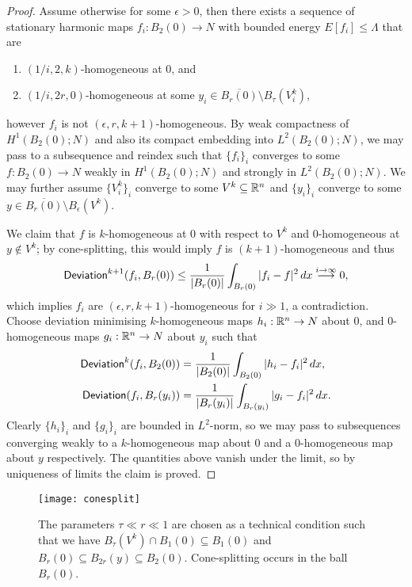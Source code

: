 \begin{proof}
	Assume otherwise for some $\epsilon > 0$, then there exists a sequence of stationary harmonic maps $f_i : B_2 (0) \to N$ with bounded energy $E[f_i] \leq \Lambda$ that are
	\begin{enumerate}
		\item $(1/i, 2, k)$-homogeneous at $0$, and
		\item $(1/i, 2r, 0)$-homogeneous at some $y_i \in \overline{B_r (0)} \setminus B_\tau (V^k_i)$,
	\end{enumerate}
	however $f_i$ is not $(\epsilon, r, k + 1)$-homogeneous. By weak compactness of $H^1 (B_2 (0); N)$ and also its compact embedding into $L^2 (B_2 (0); N)$, we may pass to a subsequence and reindex such that $\{f_i\}_i$ converges to some $f: B_2 (0) \to N$ weakly in $H^1 (B_2 (0); N)$ and strongly in $L^2 (B_2 (0); N)$. We may further assume $\{V^k_i\}_i$ converge to some $V^k \subseteq \mathbb R^n$ and $\{y_i\}_i$ converge to some $y \in \overline{B_r (0)} \setminus B_\epsilon (V^k)$. 
	
	We claim that $f$ is $k$-homogeneous at $0$ with respect to $V^k$ and $0$-homogeneous at $y \not\in V^k$; by cone-splitting, this would imply $f$ is $(k +1)$-homogeneous and thus
		\[ \mathsf{Deviation}^{ k + 1} (f_i, B_r (0)) \leq \frac{1}{|B_r (0)|} \int_{B_r (0)} |f_i - f|^2 \, dx \overset{i \to \infty}{\longrightarrow} 0, \]
	which implies $f_i$ are $(\epsilon, r, k + 1)$-homogeneous for $i \gg 1$, a contradiction. Choose deviation minimising $k$-homogeneous maps $h_i : \mathbb R^n \to N$ about $0$, and $0$-homogeneous maps $g_i : \mathbb R^n \to N$ about $y_i$ such that 
		\begin{align*}
			 \mathsf{Deviation}^{ k} (f_i, B_2 (0)) 
			 	&= \frac{1}{|B_2 (0)|} \int_{B_2 (0)} |h_i - f_i |^2 \, dx, \\
			 \mathsf{Deviation} (f_i, B_r (y_i)) 
			 	&= \frac{1}{|B_r (y_i)|} \int_{B_r (y_i)} |g_i - f_i |^2 \, dx .
		\end{align*}	 	
	Clearly $\{h_i\}_i$ and $\{g_i\}_i$ are bounded in $L^2$-norm, so we may pass to subsequences converging weakly to a $k$-homogeneous map about $0$ and a $0$-homogeneous map about $y$ respectively. The quantities above vanish under the limit, so by uniqueness of limits the claim is proved. 
\end{proof}

\begin{figure}[h]
\begin{center}
	\texttt{[image: conesplit]}
	\caption{The parameters $\tau \ll r \ll 1$ are chosen as a technical condition such that we have $B_{\tau} (V^k) \cap B_1 (0) \subseteq B_1 (0)$ and $B_r (0) \subseteq B_{2r} (y) \subseteq B_2 (0)$. Cone-splitting occurs in the ball $B_r (0)$.}
\end{center}	
\end{figure}


